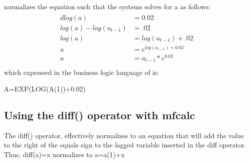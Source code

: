 \documentclass[letterpaper,10pt,english]{jupyterBook}
\begin{document}
\sphinxAtStartPar
{} normalizes the equation such that the systems solves for a as follows:
\begin{equation*}
\begin{split}
\begin{align}
dlog(a) &= 0.02\\
log(a)-log(a_{t-1}) &= .02\\
log(a) &=log(a_{t-1})+.02\\
a &= e^{log(a_{t-1})+0.02}\\
a &=a_{t-1}*e^{0.02}\\
\end{align}
\end{split}
\end{equation*}
\sphinxAtStartPar
which expressed in the business logic language of  is:

\sphinxAtStartPar
A=EXP(LOG(A(\sphinxhyphen{}1))+0.02)


\subsection{Using the diff() operator with mfcalc}
\label{\detokenize{content/04_PythonEssentials/mfcalc:using-the-diff-operator-with-mfcalc}}
\sphinxAtStartPar
The diff() operator, effectively normalizes to an equation that will add the value to the right of the equals sign to the lagged variable inserted in the diff operator.  Thus,  diff(a)=x normalizes to a=a(\sphinxhyphen{}1)+x
\end{document}
